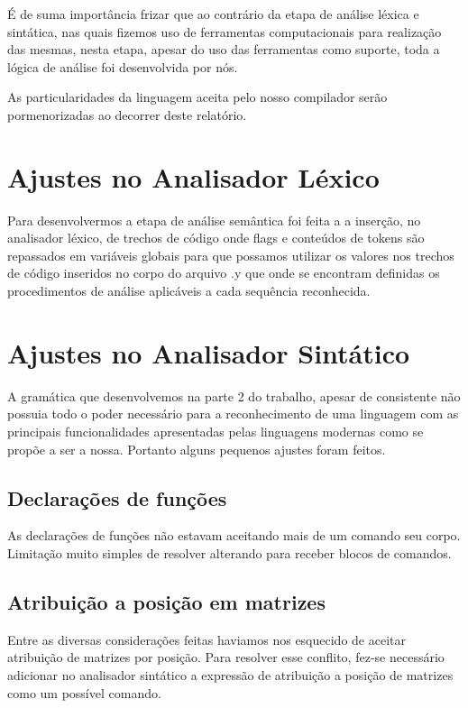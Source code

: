 \documentclass[a4paper,12pt]{report}
\begin{document}
\'E de suma import\^ancia frizar que ao contr\'ario da etapa de an\'alise l\'exica e 
sint\'atica, nas quais fizemos uso de ferramentas computacionais para realiza\c{c}\~ao das 
mesmas, nesta etapa, apesar do uso das ferramentas como suporte, toda a l\'ogica de an\'alise
foi desenvolvida por n\'os.

As particularidades da linguagem aceita pelo nosso compilador ser\~ao pormenorizadas ao 
decorrer deste relat\'orio.

\section{Ajustes no Analisador L\'exico}
  
Para desenvolvermos a etapa de an\'alise sem\^antica foi feita a a inser\c{c}\~ao, 
no analisador l\'exico, de trechos de c\'odigo onde flags e conte\'udos de tokens s\~ao 
repassados em vari\'aveis globais para que possamos utilizar os valores nos trechos de 
c\'odigo inseridos no corpo do arquivo .y que onde se encontram definidas os procedimentos 
de an\'alise aplic\'aveis a cada sequ\^encia reconhecida.

\section{Ajustes no Analisador Sint\'atico}

A gram\'atica que desenvolvemos na parte 2 do trabalho, apesar de consistente n\~ao possuia
todo o poder necess\'ario para a reconhecimento de uma linguagem com as principais
funcionalidades apresentadas pelas linguagens modernas como se prop\~oe a ser a nossa. Portanto
alguns pequenos ajustes foram feitos.

\subsection{Declara\c{c}\~oes de fun\c{c}\~oes}

As declara\c{c}\~oes de fun\c{c}\~oes n\~ao estavam aceitando mais de um comando 
seu corpo. Limita\c{c}\~ao muito simples de resolver alterando para receber blocos de comandos.

\subsection{Atribui\c{c}\~ao a posi\c{c}\~ao em matrizes}

Entre as diversas considera\c{c}\~oes feitas haviamos nos esquecido de aceitar atribui\c{c}\~ao
de matrizes por posi\c{c}\~ao. Para resolver esse conflito, fez-se necess\'ario adicionar no 
analisador sint\'atico a express\~ao de atribui\c{c}\~ao a posi\c{c}\~ao de matrizes como um 
poss\'ivel comando.
\end{document}
